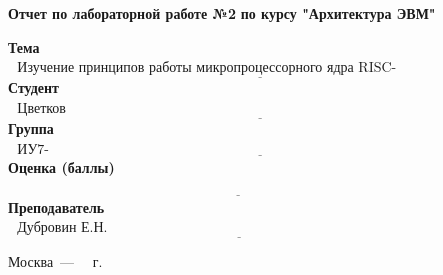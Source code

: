 \begin{titlepage}
	\begin{center}
		\noindent\begin{minipage}{1.3\textwidth}\centering
		\Large\textbf{Отчет по лабораторной работе №2}\newline
		\textbf{по курсу "Архитектура ЭВМ"}\newline\newline\newline
		\end{minipage}
	\end{center}
	

	\noindent\textbf{Тема} $\underline{\text{~~Изучение принципов работы микропроцессорного ядра RISC-V~~~~~~~~~~~~~~~~~~~~~~~~~~~~~~~~~~~}}$\newline\newline
	\noindent\textbf{Студент} $\underline{\text{~~Цветков И.А.~~~~~~~~~~~~~~~~~~~~~~~~~~~~~~~~~~~~~~~~~~~~~~~~~~~~~~~~~~~~~~~~~~~~~~~~~~~~~~~~~~~~~~~~~}}$\newline\newline
	\noindent\textbf{Группа} $\underline{\text{~~ИУ7-53Б~~~~~~~~~~~~~~~~~~~~~~~~~~~~~~~~~~~~~~~~~~~~~~~~~~~~~~~~~~~~~~~~~~~~~~~~~~~~~~~~~~~~~~~~~~~~~~~~~}}$\newline\newline
	\noindent\textbf{Оценка (баллы)} $\underline{\text{~~~~~~~~~~~~~~~~~~~~~~~~~~~~~~~~~~~~~~~~~~~~~~~~~~~~~~~~~~~~~~~~~~~~~~~~~~~~~~~~~~~~~~~~~~~~~~~~~~~}}$\newline\newline
	\noindent\textbf{Преподаватель} $\underline{\text{~~Дубровин Е.Н.~~~~~~~~~~~~~~~~~~~~~~~~~~~~~~~~~~~~~~~~~~~~~~~~~~~~~~~~~~~~~~~~~~~~~~~~~~~~~~}}$\newline
	
	\begin{center}
		\vfill
		Москва~---~\the\year
		~г.
	\end{center}
	\restoregeometry
\end{titlepage}

